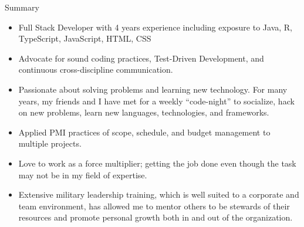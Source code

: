\documentclass[]{mcdowellcv}
\begin{document}
	
	\makeheader
	\begin{cvsection}{Summary}
		\begin{cvsubsection}{}{}{}
			\begin{itemize}
				\item Full Stack Developer with 4 years experience including exposure to Java, R, TypeScript, JavaScript, HTML, CSS
				\item Advocate for sound coding practices, Test-Driven Development, and continuous cross-discipline communication.
				\item  Passionate about solving problems and learning new technology. For many years, my friends and I have met for a weekly \enquote{code-night} to socialize, hack on new problems, learn new languages, technologies, and frameworks.
				\item Applied PMI practices of scope, schedule, and budget management to multiple projects.
				\item Love to work as a force multiplier; getting the job done even though the task may not be in my field of expertise.
				\item Extensive military leadership training, which is well suited to a corporate and team environment, has allowed me to mentor others to be stewards of their resources and promote personal growth both in and out of the organization.
			\end{itemize}
		\end{cvsubsection}
	\end{cvsection}
\end{document}
